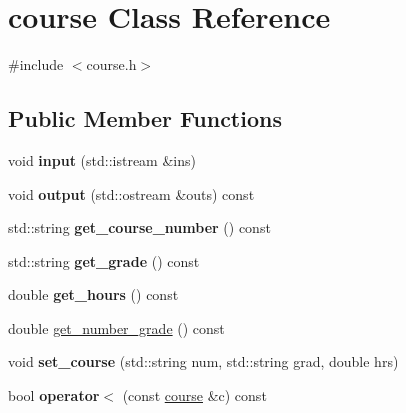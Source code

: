 \hypertarget{classcourse}{}\section{course Class Reference}
\label{classcourse}


{\ttfamily \#include $<$course.\+h$>$}

\subsection*{Public Member Functions}
\begin{DoxyCompactItemize}
\item 
void {\bfseries input} (std\+::istream \&ins)\hypertarget{classcourse_a0a8839f2369903101399bca60547aed2}{}\label{classcourse_a0a8839f2369903101399bca60547aed2}

\item 
void {\bfseries output} (std\+::ostream \&outs) const \hypertarget{classcourse_adf8ca7160e06644424027332c733242a}{}\label{classcourse_adf8ca7160e06644424027332c733242a}

\item 
std\+::string {\bfseries get\+\_\+course\+\_\+number} () const \hypertarget{classcourse_af8bc5c1d6f03de72f643a3011428b979}{}\label{classcourse_af8bc5c1d6f03de72f643a3011428b979}

\item 
std\+::string {\bfseries get\+\_\+grade} () const \hypertarget{classcourse_a1ac5854ce76435b9f286d814e16f27bc}{}\label{classcourse_a1ac5854ce76435b9f286d814e16f27bc}

\item 
double {\bfseries get\+\_\+hours} () const \hypertarget{classcourse_a8a2b5572f9d13e3cb3fd054b66bc70ac}{}\label{classcourse_a8a2b5572f9d13e3cb3fd054b66bc70ac}

\item 
double \hyperlink{classcourse_a525d1dd085d0a9f77f861ec5f0b04f6c}{get\+\_\+number\+\_\+grade} () const 
\item 
void {\bfseries set\+\_\+course} (std\+::string num, std\+::string grad, double hrs)\hypertarget{classcourse_a1fce1a16efb3f07d0da5daca8005e4a6}{}\label{classcourse_a1fce1a16efb3f07d0da5daca8005e4a6}

\item 
bool {\bfseries operator$<$} (const \hyperlink{classcourse}{course} \&c) const \hypertarget{classcourse_a1666b9203d42b2cda999d52c3fbcd342}{}\label{classcourse_a1666b9203d42b2cda999d52c3fbcd342}


\end{DoxyCompactItemize}
